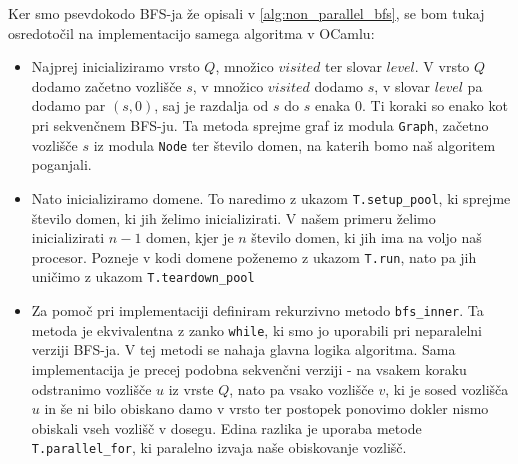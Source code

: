 \documentclass[mat1, tisk]{fmfdelo}
\begin{document}
  Ker smo psevdokodo BFS-ja že opisali v \ref{alg:non_parallel_bfs}, se bom tukaj osredotočil na implementacijo samega algoritma v OCamlu:
  \begin{itemize}
    \item Najprej inicializiramo vrsto $Q$, množico $visited$ ter slovar $level$. V vrsto $Q$ dodamo začetno vozlišče $s$, v množico $visited$ dodamo $s$,
          v slovar $level$ pa dodamo par $(s, 0)$, saj je razdalja od $s$ do $s$ enaka $0$. Ti koraki so enako kot pri sekvenčnem BFS-ju.
          Ta metoda sprejme graf iz modula \texttt{Graph}, začetno vozlišče $s$ iz modula \texttt{Node} ter število domen, na katerih bomo
          naš algoritem poganjali.
    \item Nato inicializiramo domene. To naredimo z ukazom \texttt{T.setup\_pool}, ki sprejme število domen, ki jih želimo inicializirati.
          V našem primeru želimo inicializirati $n-1$ domen, kjer je $n$ število domen, ki jih ima na voljo naš procesor.
          Pozneje v kodi domene poženemo z ukazom \texttt{T.run}, nato pa jih uničimo z ukazom \texttt{T.teardown\_pool}
    \item Za pomoč pri implementaciji definiram rekurzivno metodo \texttt{bfs\_inner}. Ta metoda je ekvivalentna z zanko \texttt{while},
          ki smo jo uporabili pri neparalelni verziji BFS-ja. V tej metodi se nahaja glavna logika algoritma. Sama implementacija je precej podobna
          sekvenčni verziji - na vsakem koraku odstranimo vozlišče $u$ iz vrste $Q$, nato pa vsako vozlišče $v$, ki je sosed vozlišča $u$ in še ni bilo obiskano
          damo v vrsto ter postopek ponovimo dokler nismo obiskali vseh vozlišč v dosegu. Edina razlika je uporaba metode \texttt{T.parallel\_for}, ki paralelno 
          izvaja naše obiskovanje vozlišč.
  \end{itemize}
\end{document}
